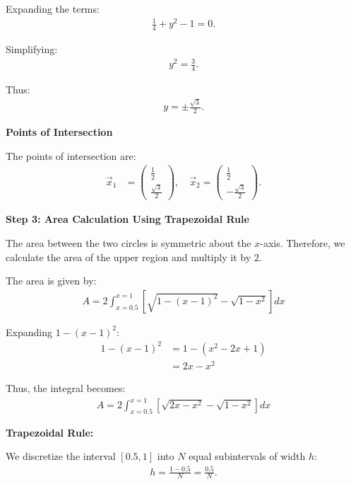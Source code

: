 \documentclass[journal]{IEEEtran}
\begin{document}
Expanding the terms:
\begin{align}
    \frac{1}{4} + y^2 - 1 = 0.
\end{align}

Simplifying:
\begin{align}
    y^2 = \frac{3}{4}.
\end{align}

Thus:
\begin{align}
    y = \pm \frac{\sqrt{3}}{2}.
\end{align}

\textbf{ Points of Intersection}

The points of intersection are:
\begin{align}
    \vec{x}_1 &= \begin{pmatrix} \frac{1}{2} \\ \frac{\sqrt{3}}{2} \end{pmatrix}, \quad
    \vec{x}_2 = \begin{pmatrix} \frac{1}{2} \\ -\frac{\sqrt{3}}{2} \end{pmatrix}.
\end{align}


\textbf{Step 3: Area Calculation Using Trapezoidal Rule}

The area between the two circles is symmetric about the $x$-axis. Therefore, we calculate the area of the upper region and multiply it by $2$.


The area is given by:
\begin{align}
    A = 2 \int_{x=0.5}^{x=1} \left[ \sqrt{1 - (x - 1)^2} - \sqrt{1 - x^2} \right] dx
\end{align}

Expanding $1 - (x - 1)^2$:
\begin{align}
    1 - (x - 1)^2 &= 1 - (x^2 - 2x + 1) \\
    &= 2x - x^2
\end{align}

Thus, the integral becomes:
\begin{align}
    A = 2 \int_{x=0.5}^{x=1} \left[ \sqrt{2x - x^2} - \sqrt{1 - x^2} \right] dx
\end{align}

\textbf{Trapezoidal Rule:}

We discretize the interval $[0.5, 1]$ into $N$ equal subintervals of width $h$:
\begin{align}
    h = \frac{1 - 0.5}{N} = \frac{0.5}{N}.
\end{align}
\end{document}
